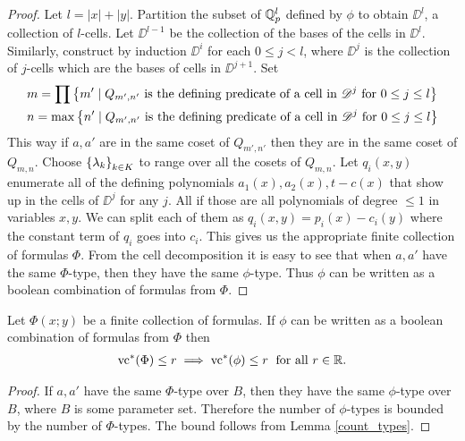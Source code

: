 \begin{proof}
  Let $l = |x| + |y|$.
  Partition the subset of $\mathbb{Q}_p^l$ defined by $\phi$ to obtain $\DD^l$, a collection of $l$-cells.
  Let $\DD^{l-1}$ be the collection of the bases of the cells in $\DD^l$.
  Similarly, construct by induction $\DD^i$ for each $0 \leq j < l$,
  where $\DD^j$ is the collection of $j$-cells which are the bases of cells in $\DD^{j+1}$.
  Set
  \begin{align*}
    &m = \prod \left\{m' \mid Q_{m',n'} \text{ is the defining predicate of a cell in $\mathscr D^j$ for $0 \leq j \leq l$} \right\} \\
    &n = \max \left\{n' \mid Q_{m',n'} \text{ is the defining predicate of a cell in $\mathscr D^j$ for $0 \leq j \leq l$} \right\}
  \end{align*}
  This way if $a, a'$ are in the same coset of $Q_{m',n'}$ then they are in the same coset of $Q_{m,n}$.
  Choose $\left\{\lambda_k\right\}_{k \in K}$ to range over all the cosets of $Q_{m,n}$.
  Let $q_i(x, y)$ enumerate all of the defining polynomials $a_1(x), a_2(x), t - c(x)$ that show up in the cells of $\DD^j$ for any $j$.
  All if those are all polynomials of degree $\leq 1$ in variables $x, y$.
  We can split each of them as $q_i(x,y) = p_i(x) - c_i(y)$ where the constant term of $q_i$ goes into $c_i$.
  This gives us the appropriate finite collection of formulas $\Phi$.
  From the cell decomposition it is easy to see that when $a, a'$ have the same $\Phi$-type,
  then they have the same $\phi$-type.
  Thus $\phi$ can be written as a boolean combination of formulas from $\Phi$.
\end{proof}

\begin{Lemma}
  Let $\Phi(x; y)$ be a finite collection of formulas.
  If $\phi$ can be written as a boolean combination of formulas from $\Phi$ then
  \begin{align*}
    \operatorname{vc}^* (\Phi) \leq r \implies \operatorname{vc}^* (\phi) \leq r \; \text{ for all } r \in \mathbb{R}.
  \end{align*}
\end{Lemma}
\begin{proof}
  If $a,a'$ have the same $\Phi$-type over $B$, then they have the same $\phi$-type over $B$, where $B$ is some parameter set.
  Therefore the number of $\phi$-types is bounded by the number of $\Phi$-types.
  The bound follows from Lemma \ref{count_types}.
\end{proof}


